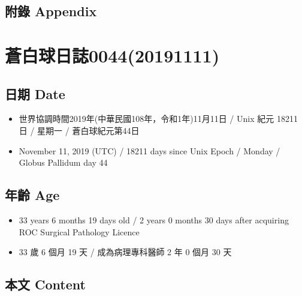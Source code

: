 \documentclass[a5paper, 12pt
]{book}
\providecommand{\tightlist}{%
  \setlength{\itemsep}{0pt}\setlength{\parskip}{0pt}}
\begin{document}
\hypertarget{ux9644ux9304-appendix-35}{%
\subsection{附錄 Appendix}\label{ux9644ux9304-appendix-35}}

\hypertarget{ux84bcux767dux7403ux65e5ux8a8c004420191111}{%
\section{蒼白球日誌0044(20191111)}\label{ux84bcux767dux7403ux65e5ux8a8c004420191111}}

\hypertarget{ux65e5ux671f-date-43}{%
\subsection{日期 Date}\label{ux65e5ux671f-date-43}}

\begin{itemize}
\tightlist
\item
  世界協調時間2019年(中華民國108年，令和1年)11月11日 / Unix 紀元 18211
  日 / 星期一 / 蒼白球紀元第44日
\item
  November 11, 2019 (UTC) / 18211 days since Unix Epoch / Monday /
  Globus Pallidum day 44
\end{itemize}

\hypertarget{ux5e74ux9f61-age-43}{%
\subsection{年齡 Age}\label{ux5e74ux9f61-age-43}}

\begin{itemize}
\tightlist
\item
  33 years 6 months 19 days old / 2 years 0 months 30 days after
  acquiring ROC Surgical Pathology Licence
\item
  33 歲 6 個月 19 天 / 成為病理專科醫師 2 年 0 個月 30 天
\end{itemize}

\hypertarget{ux672cux6587-content-43}{%
\subsection{本文 Content}\label{ux672cux6587-content-43}}
\end{document}
